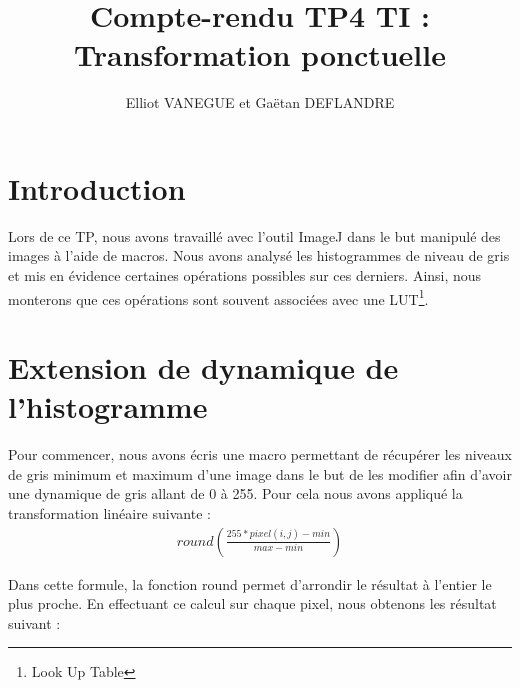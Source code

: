 \documentclass[a4paper,11pt]{article}
\title{Compte-rendu TP4 TI : Transformation ponctuelle}
\author{Elliot VANEGUE et Gaëtan DEFLANDRE}
\begin{document}


  \maketitle
  
  \mbox{}
  \newpage
  \clearpage
  
  \section*{Introduction}
  Lors de ce TP, nous avons travaillé avec l'outil ImageJ dans le but manipulé des images
  à l'aide de macros. Nous avons analysé les histogrammes de niveau de gris et mis en 
  évidence certaines opérations possibles sur ces derniers. Ainsi, nous monterons que ces
  opérations sont souvent associées avec une LUT\footnote{Look Up Table}.

  \section{Extension de dynamique de l'histogramme}
  Pour commencer, nous avons écris une macro permettant de récupérer les niveaux de gris minimum et 
  maximum d'une image dans le but de les modifier afin d'avoir une dynamique de gris allant de 
  0 à 255. Pour cela nous avons appliqué la transformation linéaire suivante : 
  \begin{align*}
   round\left(\frac{255 * pixel(i,j) - min}{max - min}\right)
  \end{align*}

  Dans cette formule, la fonction round permet d'arrondir le résultat à l'entier le plus proche.
  En effectuant ce calcul sur chaque pixel, nous obtenons les résultat suivant :\\
  
\end{document}
